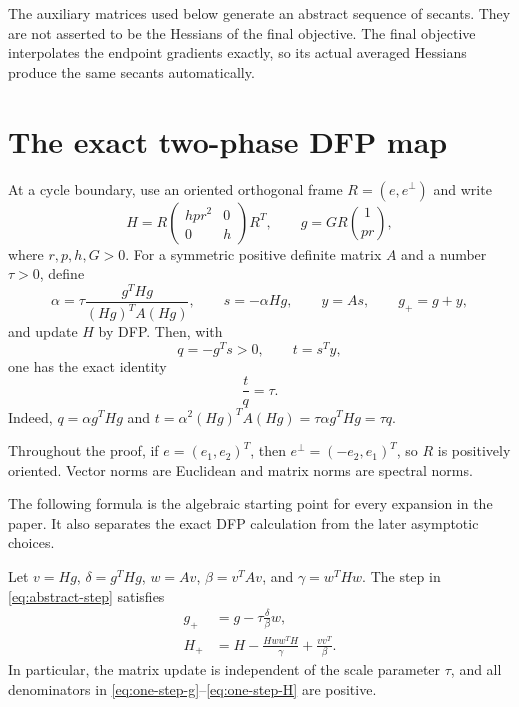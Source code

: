 \documentclass[smallextended,envcountsame]{svjour3}
\begin{document}
The auxiliary matrices used below generate an abstract sequence of secants.
They are not asserted to be the Hessians of the final objective.  The final
objective interpolates the endpoint gradients exactly, so its actual averaged
Hessians produce the same secants automatically.

\section{The exact two-phase DFP map}
\label{sec:two-phase}

At a cycle boundary, use an oriented orthogonal frame $R=(e,e^\perp)$ and
write
\begin{equation}\label{eq:canonical-state}
H=R\begin{pmatrix}hpr^2&0\\0&h\end{pmatrix}R^T,
\qquad
g=GR\binom{1}{pr},
\end{equation}
where $r,p,h,G>0$.  For a symmetric positive definite matrix $A$ and a
number $\tau>0$, define
\begin{equation}\label{eq:abstract-step}
\alpha=\tau\frac{g^THg}{(Hg)^TA(Hg)},\qquad
s=-\alpha Hg,\qquad y=As,\qquad g_+=g+y,
\end{equation}
and update $H$ by DFP.  Then, with
\[
q=-g^Ts>0,\qquad t=s^Ty,
\]
one has the exact identity
\begin{equation}\label{eq:line-ratio}
\frac tq=\tau.
\end{equation}
Indeed, $q=\alpha g^THg$ and
$t=\alpha^2(Hg)^TA(Hg)=\tau\alpha g^THg=\tau q$.

Throughout the proof, if $e=(e_1,e_2)^T$, then
$e^\perp=(-e_2,e_1)^T$, so $R$ is positively oriented.  Vector norms are
Euclidean and matrix norms are spectral norms.

The following formula is the algebraic starting point for every expansion in
the paper.  It also separates the exact DFP calculation from the later
asymptotic choices.

\begin{proposition}\label{prop:one-step}
Let $v=Hg$, $\delta=g^THg$, $w=Av$, $\beta=v^TAv$, and
$\gamma=w^THw$.  The step in \eqref{eq:abstract-step} satisfies
\begin{align}
g_+&=g-\tau\frac{\delta}{\beta}w,
\label{eq:one-step-g}\\
H_+&=H-\frac{Hww^TH}{\gamma}+\frac{vv^T}{\beta}.
\label{eq:one-step-H}
\end{align}
In particular, the matrix update is independent of the scale parameter
$\tau$, and all denominators in \eqref{eq:one-step-g}--\eqref{eq:one-step-H}
are positive.
\end{proposition}
\end{document}
